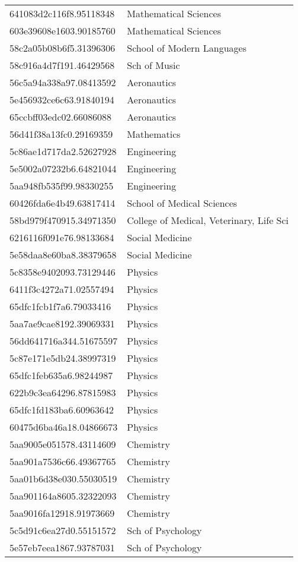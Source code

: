 \begin{tabular}{ll}
641083d2c116f8.95118348 & Mathematical Sciences \\
603e39608e1603.90185760 & Mathematical Sciences \\
58c2a05b08b6f5.31396306 & School of Modern Languages \\
58c916a4d7f191.46429568 & Sch of Music \\
56c5a94a338a97.08413592 & Aeronautics \\
5e456932ce6c63.91840194 & Aeronautics \\
65ccbff03edc02.66086088 & Aeronautics \\
56d41f38a13fc0.29169359 & Mathematics \\
5c86ae1d717da2.52627928 & Engineering \\
5e5002a07232b6.64821044 & Engineering \\
5aa948fb535f99.98330255 & Engineering \\
60426fda6e4b49.63817414 & School of Medical Sciences \\
58bd979f470915.34971350 & College of Medical, Veterinary, Life Sci \\
6216116f091e76.98133684 & Social Medicine \\
5e58daa8e60ba8.38379658 & Social Medicine \\
5c8358e9402093.73129446 & Physics \\
6411f3c4272a71.02557494 & Physics \\
65dfc1fcb1f7a6.79033416 & Physics \\
5aa7ae9cae8192.39069331 & Physics \\
56dd641716a344.51675597 & Physics \\
5c87e171e5db24.38997319 & Physics \\
65dfc1feb635a6.98244987 & Physics \\
622b9c3ea64296.87815983 & Physics \\
65dfc1fd183ba6.60963642 & Physics \\
60475d6ba46a18.04866673 & Physics \\
5aa9005e051578.43114609 & Chemistry \\
5aa901a7536c66.49367765 & Chemistry \\
5aa01b6d38e030.55030519 & Chemistry \\
5aa901164a8605.32322093 & Chemistry \\
5aa9016fa12918.91973669 & Chemistry \\
5c5d91c6ea27d0.55151572 & Sch of Psychology \\
5e57eb7eea1867.93787031 & Sch of Psychology \\

\end{tabular}
